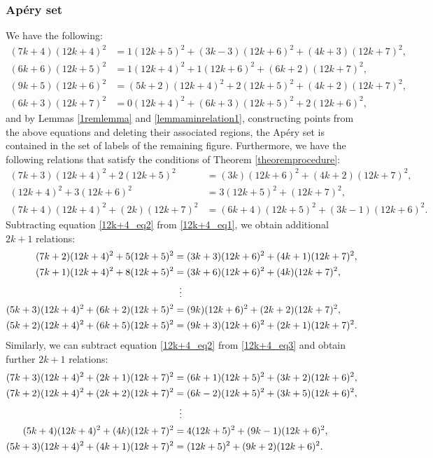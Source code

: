 \documentclass[12pt]{article}
\theoremstyle{remark}
\begin{document}
\subsubsection{Ap{\'e}ry set}
We have the following:
\begin{align}
    (7k+4)(12k+4)^2 &= 1(12k+5)^2 + (3k-3)(12k+6)^2 + (4k+3)(12k+7)^2, \label{12k+4minrelation0} \\
    (6k+6)(12k+5)^2 &= 1(12k+4)^2 + 1(12k+6)^2 + (6k+2)(12k+7)^2, \label{12k+4minrelation1} \\
    (9k+5)(12k+6)^2 &= (5k+2)(12k+4)^2 + 2(12k+5)^2 + (4k+2)(12k+7)^2, \label{12k+4minrelation2}\\
    (6k+3)(12k+7)^2 &= 0(12k+4)^2 + (6k+3)(12k+5)^2 + 2(12k+6)^2,  \label{12k+4minrelation3}
\end{align}
and by Lemmas \ref{1remlemma} and \ref{lemmaminrelation1}, constructing points from the above equations and deleting their associated regions, the Ap{\'e}ry set is contained in the set of labels of the remaining figure.
Furthermore, we have the following relations that satisfy the conditions of Theorem \ref{theoremprocedure}:
\begin{align}
    (7k+3)(12k+4)^2 + 2(12k+5)^2 &= (3k)(12k+6)^2 + (4k+2)(12k+7)^2 , \label{12k+4_eq1} \\
    (12k+4)^2 + 3(12k+6)^2 &= 3(12k+5)^2 + (12k+7)^2,\label{12k+4_eq2} \\
    (7k+4)(12k+4)^2 + (2k)(12k+7)^2 &= (6k+4)(12k+5)^2 + (3k-1)(12k+6)^2 .\label{12k+4_eq3}
\end{align}
Subtracting equation \eqref{12k+4_eq2} from \eqref{12k+4_eq1}, we obtain additional $2k+1$ relations:
\begin{equation}\label{12k+4_2k+1equations_1}
\begin{aligned}    
(7k+2)(12k+4)^2 + 5(12k+5)^2 &= (3k+3)(12k+6)^2 + (4k+1)(12k+7)^2,\\
(7k+1)(12k+4)^2 + 8(12k+5)^2 &= (3k+6)(12k+6)^2 + (4k)(12k+7)^2,\\
 & \hspace{5.6pt}  \vdots      \\
(5k+3)(12k+4)^2 + (6k+2)(12k+5)^2 &= (9k)(12k+6)^2 + (2k+2)(12k+7)^2, \\
(5k+2)(12k+4)^2 + (6k+5)(12k+5)^2 &= (9k+3)(12k+6)^2 + (2k+1)(12k+7)^2.
\end{aligned}
\end{equation}
Similarly, we can subtract equation \eqref{12k+4_eq2} from \eqref{12k+4_eq3} and obtain further $2k+1$ relations:
\begin{equation}\label{12k+4_2k+1equations_2}
\begin{aligned}    
(7k+3)(12k+4)^2 + (2k+1)(12k+7)^2 &= (6k+1)(12k+5)^2 + (3k+2)(12k+6)^2,\\
(7k+2)(12k+4)^2 + (2k+2)(12k+7)^2 &= (6k-2)(12k+5)^2 + (3k+5)(12k+6)^2,\\
 & \hspace{5.6pt}  \vdots      \\
(5k+4)(12k+4)^2 + (4k)(12k+7)^2 &= 4(12k+5)^2 + (9k-1)(12k+6)^2, \\
(5k+3)(12k+4)^2 + (4k+1)(12k+7)^2 &= (12k+5)^2 + (9k+2)(12k+6)^2.
\end{aligned}
\end{equation}
\end{document}
